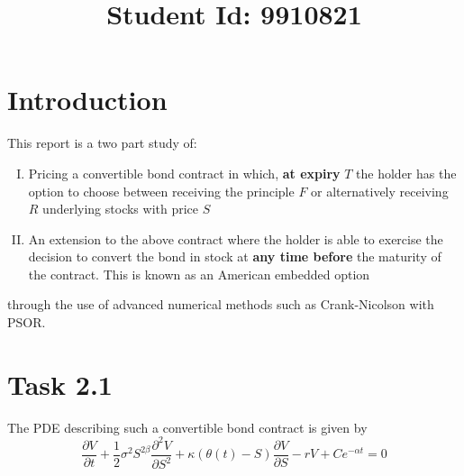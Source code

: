 \documentclass{article}
\begin{document}
\title{Student Id: 9910821}
\date{}

\maketitle
\section*{Introduction}
This report is a two part study of:
\begin{enumerate}[I)]
  \item Pricing a convertible bond contract in  which, \textbf{at expiry} $T$ the  holder  has  the option to  choose  between  receiving the principle $F$ or alternatively receiving $R$ underlying stocks with price $S$
  \item An extension to the above contract where the holder is able to exercise the decision to convert the bond in stock at \textbf{any time before} the maturity of the contract. This is known as an American embedded option
\end{enumerate}
through the use of advanced numerical methods such as Crank-Nicolson with PSOR.

\section*{Task 2.1}
The PDE describing such a convertible bond contract is given by
\begin{equation}
  \frac{\partial V}{\partial t} + \frac{1}{2}\sigma^{2}S^{2\beta}\frac{\partial^2 V}{\partial S^2}+\kappa(\theta (t) -S)\frac{\partial V}{\partial S} -rV + Ce^{-\alpha t} =0
  \label{eq:pde_convertible}
\end{equation}
\end{document}
